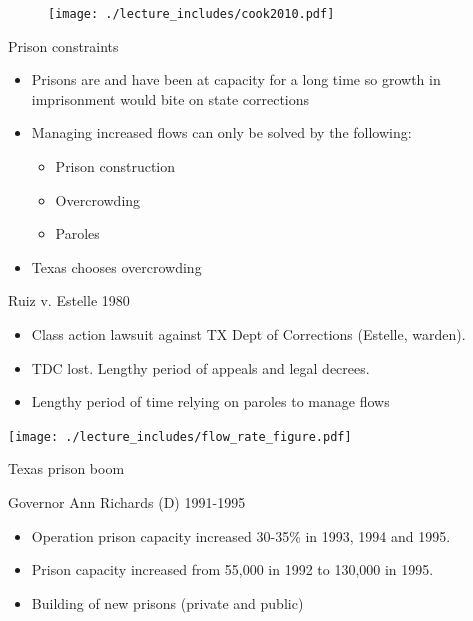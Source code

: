 \documentclass{beamer}
\begin{document}
\begin{frame}[plain]

\begin{figure}
\texttt{[image: ./lecture\_includes/cook2010.pdf]}
\end{figure}
\end{frame}


\begin{frame}{Prison constraints}

	
	\begin{itemize}
	\item Prisons are and have been at capacity for a long time so growth in imprisonment would bite on state corrections
	\item Managing increased flows can only be solved by the following:
		\begin{itemize}
		\item Prison construction
		\item Overcrowding
		\item Paroles
		\end{itemize}
	\item Texas chooses overcrowding
	\end{itemize}
\end{frame}



\begin{frame}{Ruiz v. Estelle 1980}

	
	\begin{itemize}
		\item Class action lawsuit against TX Dept of Corrections (Estelle, warden). 
		\item TDC lost.  Lengthy period of appeals and legal decrees.  
		\item Lengthy period of time relying on paroles to manage flows
	\end{itemize}
\end{frame}

\begin{frame}[plain]
  \texttt{[image: ./lecture\_includes/flow\_rate\_figure.pdf]}
\end{frame}

\begin{frame}{Texas prison boom}

Governor Ann Richards (D) 1991-1995
		\begin{itemize}
		\item Operation prison capacity increased 30-35\% in 1993, 1994 and 1995. 
		\item Prison capacity increased from 55,000 in 1992 to 130,000 in 1995.  
		\item Building of new prisons (private and public)
		\end{itemize} 
\end{frame}
\end{document}
